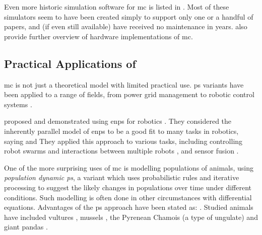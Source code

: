 Even more historic simulation software for \gls{mc} is listed in \cite{Raghavan2016}.  Most of these simulators seem to have been created simply to support only one or a handful of papers, and (if even still available) have received no maintenance in years.  \citeauthor{Zhang2020} \cite{Zhang2020} also provide further overview of hardware implementations of \gls{mc}. %



\subsection{\label{sec:psystemsuses}Practical Applications of }
\Gls{mc} is not just a theoretical model with limited practical use.  \Gls{ps} variants have been applied to a range of fields, from power grid management to robotic control systems \cite{Zhang2017}.

\citeauthor{Florea2017} proposed and demonstrated using \gls{enps} for robotics \cite{Florea2017,Florea2016,Florea2017a,Florea2019,Florea2016a,Florea2018}.  They considered the inherently parallel model of \gls{enps} to be a good fit to many tasks in robotics, saying  and   They applied this approach to various tasks, including controlling robot swarms \cite{Florea2016} and interactions between multiple robots \cite{Florea2017}, and sensor fusion \cite{Florea2019}.

One of the more surprising uses of \gls{mc} is modelling populations of animals, using \emph{population dynamic \gls{ps}}, a variant which uses probabilistic rules and iterative processing to suggest the likely changes in populations over time under different conditions.  Such modelling is often done in other circumstances with differential equations.  Advantages of the \gls{ps} approach have been stated as: .  Studied animals have included vultures \cite{Cardona2009,Colomer2011}, mussels \cite{Colomer2014}, the Pyrenean Chamois (a type of ungulate) \cite{Colomer2010} and giant pandas \cite{Duan2020}.

